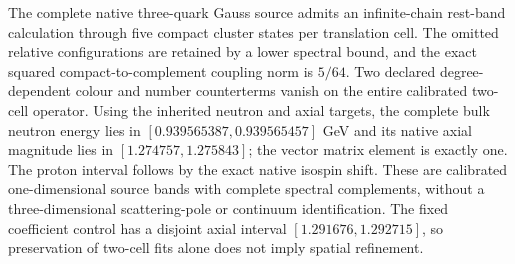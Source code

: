 The complete native three-quark Gauss source admits an infinite-chain
rest-band calculation through five compact cluster states per translation
cell. The omitted relative configurations are retained by a lower spectral
bound, and the exact squared compact-to-complement coupling norm is $5/64$.
Two declared degree-dependent colour and number counterterms vanish on the
entire calibrated two-cell operator. Using the inherited neutron and axial
targets, the complete bulk neutron energy lies in
$[0.939565387,0.939565457]$ GeV and its native axial magnitude lies in
$[1.274757,1.275843]$; the vector matrix element is exactly one. The proton
interval follows by the exact native isospin shift. These are calibrated
one-dimensional source bands with complete spectral complements, without a
three-dimensional scattering-pole or continuum identification. The fixed
coefficient control has a disjoint axial interval
$[1.291676,1.292715]$, so preservation of two-cell fits alone does not imply
spatial refinement.

